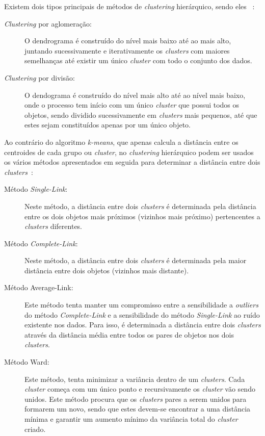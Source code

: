 Existem dois tipos principais de métodos de \textit{clustering} hierárquico, sendo eles~\citet{Liu2011} :

\begin{description}
\item[\textit{Clustering} por aglomeração:] O dendrograma é construído do nível mais baixo até ao mais alto, juntando sucessivamente e iterativamente os \textit{clusters} com maiores semelhanças até existir um único \textit{cluster} com todo o conjunto dos dados.

\item[\textit{Clustering} por divisão:] O dendograma é construído do nível mais alto até ao nível mais baixo, onde o processo tem início com um único \textit{cluster} que possui todos os objetos, sendo dividido sucessivamente em \textit{clusters} mais pequenos, até que estes sejam constituídos apenas por um único objeto.
\end{description}

Ao contrário do algoritmo \textit{k-means}, que apenas calcula a distância entre os centroides de cada grupo ou \textit{cluster}, no \textit{clustering} hierárquico podem ser usados os vários métodos apresentados em seguida para determinar a distância entre dois \textit{clusters}~\citet{Liu2011}: 

\begin{description}
\item[Método \textit{Single-Link}:] Neste método, a distância entre dois \textit{clusters} é determinada pela distância entre os dois objetos mais próximos (vizinhos mais próximo) pertencentes a \textit{clusters} diferentes.
\item[Método \textit{Complete-Link}:] Neste método, a distância entre dois \textit{clusters} é determinada pela maior distância entre dois objetos (vizinhos mais distante).
\item[Método Average-Link:] Este método tenta manter um compromisso entre a sensibilidade a \textit{outliers} do método \textit{Complete-Link} e a sensibilidade do método \textit{Single-Link} ao ruído existente nos dados. Para isso, é determinada a distância entre dois \textit{clusters} através da distância média entre todos os pares de objetos nos dois \textit{clusters}.
\item[Método Ward:] Este método, tenta minimizar a variância dentro de um \textit{clusters}. Cada \textit{cluster} começa com um único ponto e recursivamente os \textit{cluster} vão sendo unidos. Este método procura que os \textit{clusters} pares a serem unidos para formarem um novo, sendo que estes devem-se encontrar a uma distância mínima e garantir um aumento mínimo da variância total do \textit{cluster} criado.  
\end{description}

